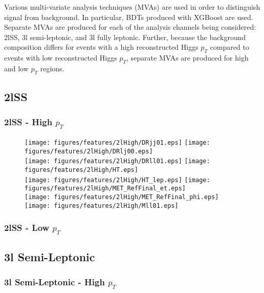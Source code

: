 Various multi-variate analysis techniques (MVAs) are used in order to distinguish signal from background. In particular, BDTs produced with XGBoost are used. Separate MVAs are produced for each of the analysis channels being considered: 2lSS, 3l semi-leptonic, and 3l fully leptonic. Further, because the background composition differs for events with a high reconstructed Higgs $p_T$ compared to events with low reconstructed Higgs $p_T$, separate MVAs are produced for high and low $p_T$ regions. 

\subsection{2lSS}
\label{sec:2lSigBkg}

\subsubsection{2lSS - High $p_T$}
\label{sec:2lHigh}

\begin{figure}[!htbp]
\centering
\texttt{[image: figures/features/2lHigh/DRjj01.eps]}%
\texttt{[image: figures/features/2lHigh/DRlj00.eps]}\\
\texttt{[image: figures/features/2lHigh/DRll01.eps]}%
\texttt{[image: figures/features/2lHigh/HT.eps]}\\
\texttt{[image: figures/features/2lHigh/HT\_lep.eps]}%
\texttt{[image: figures/features/2lHigh/MET\_RefFinal\_et.eps]}\\
\texttt{[image: figures/features/2lHigh/MET\_RefFinal\_phi.eps]}%
\texttt{[image: figures/features/2lHigh/Mll01.eps]}\\
\caption{}
\label{fig:}
\end{figure}

\subsubsection{2lSS - Low $p_T$}
\label{sec:2lLow}

\subsection{3l Semi-Leptonic}
\label{sec:3lSSigBkg}

\subsubsection{3l Semi-Leptonic - High $p_T$}
\label{sec:3lSHigh}


